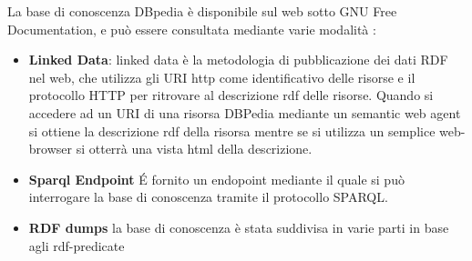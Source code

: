  La base di conoscenza DBpedia è disponibile sul web sotto GNU Free Documentation, e può essere consultata mediante varie modalità :
\begin{itemize}
\item \textbf{Linked Data}: linked data è la metodologia di pubblicazione  dei dati RDF nel web, che utilizza gli URI http come identificativo delle risorse e il protocollo HTTP per ritrovare al descrizione rdf delle risorse. Quando si accedere ad un URI di una risorsa DBPedia mediante un semantic web agent si ottiene la descrizione rdf della risorsa mentre se si utilizza un semplice web-browser si otterrà una vista html della descrizione.
\item \textbf{Sparql Endpoint } \'E fornito un endopoint mediante il quale si può interrogare la base di conoscenza tramite il protocollo SPARQL.
\item \textbf{RDF dumps} la base di conoscenza è stata suddivisa in varie parti in base agli rdf-predicate 
\end{itemize}